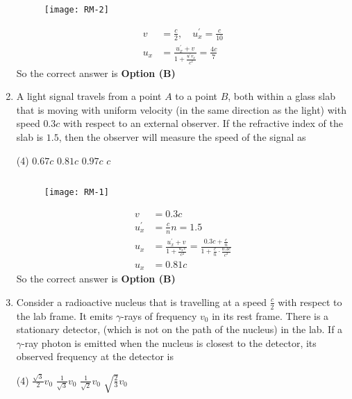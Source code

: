 \begin{enumerate}
\begin{answer}
\begin{figure}[H]
	\centering
	\texttt{[image: RM-2]}
\end{figure}
\begin{align*}
v&=\frac{c}{2}, \quad u_{x}^{\prime}=\frac{c}{10}\\
u_{x}&=\frac{u_{x}^{\prime}+v}{1+\frac{u^{\prime} v_{x}}{c^{2}}}=\frac{4 c}{7}
\end{align*}
So the correct answer is \textbf{Option (B)}
\end{answer}
	\item A light signal travels from a point $A$ to a point $B$, both within a glass slab that is moving with uniform velocity (in the same direction as the light) with speed $0.3 c$ with respect to an external observer. If the refractive index of the slab is $1.5$, then the observer will measure the speed of the signal as
{	}
\begin{tasks}(4)
\task[\textbf{A.}] $0.67 c$
\task[\textbf{B.}]  $0.81 c$
\task[\textbf{C.}] $0.97 c$
\task[\textbf{D.}] $c$
\end{tasks}
\begin{answer}$\left. \right. $
\begin{figure}[H]
	\centering
	\texttt{[image: RM-1]}
\end{figure}
\begin{align*}
v&=0.3 c\\
u_{x}^{\prime}&=\frac{c}{n} n=1.5\\
u_{x}&=\frac{u_{x}^{\prime}+v}{1+\frac{u_{x} v}{c^{2}}}=\frac{0.3 c+\frac{c}{n}}{1+\frac{c}{n} \cdot \frac{0.3 c}{c^{2}}}\\
u_{x}&=0.81 c
\end{align*}
So the correct answer is \textbf{Option (B)}
\end{answer}
	\item Consider a radioactive nucleus that is travelling at a speed $\frac{c}{2}$ with respect to the lab frame. It emits $\gamma$-rays of frequency $v_{0}$ in its rest frame. There is a stationary detector, (which is not on the path of the nucleus) in the lab. If a $\gamma$-ray photon is emitted when the nucleus is closest to the detector, its observed frequency at the detector is
{	}
\begin{tasks}(4)
\task[\textbf{A.}]  $\frac{\sqrt{3}}{2} v_{0}$
\task[\textbf{B.}] $\frac{1}{\sqrt{3}} v_{0}$
\task[\textbf{C.}] $\frac{1}{\sqrt{2}} v_{0}$
\task[\textbf{D.}] $\sqrt{\frac{2}{3}} v_{0}$
\end{tasks}

\end{enumerate}
